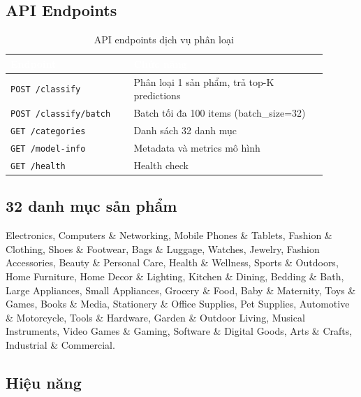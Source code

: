 \subsection{API Endpoints}

\begin{table}[htbp]
\centering
\caption{API endpoints dịch vụ phân loại}
\label{tab:classify-api}
\begin{tabular}{>{\raggedright\arraybackslash}p{0.35\linewidth} >{\raggedright\arraybackslash}p{0.55\linewidth}}
\toprule
\rowcolor{headerblue} \textcolor{white}{\textbf{Endpoint}} & \textcolor{white}{\textbf{Chức năng}} \\
\midrule
\rowcolor{rowgray} \texttt{POST /classify} & Phân loại 1 sản phẩm, trả top-K predictions \\
\texttt{POST /classify/batch} & Batch tối đa 100 items (batch\_size=32) \\
\rowcolor{rowgray} \texttt{GET /categories} & Danh sách 32 danh mục \\
\texttt{GET /model-info} & Metadata và metrics mô hình \\
\rowcolor{rowgray} \texttt{GET /health} & Health check \\
\bottomrule
\end{tabular}
\end{table}

\subsection{32 danh mục sản phẩm}

Electronics, Computers \& Networking, Mobile Phones \& Tablets, Fashion \& Clothing,
Shoes \& Footwear, Bags \& Luggage, Watches, Jewelry, Fashion Accessories,
Beauty \& Personal Care, Health \& Wellness, Sports \& Outdoors, Home Furniture,
Home Decor \& Lighting, Kitchen \& Dining, Bedding \& Bath, Large Appliances,
Small Appliances, Grocery \& Food, Baby \& Maternity, Toys \& Games, Books \& Media,
Stationery \& Office Supplies, Pet Supplies, Automotive \& Motorcycle,
Tools \& Hardware, Garden \& Outdoor Living, Musical Instruments,
Video Games \& Gaming, Software \& Digital Goods, Arts \& Crafts,
Industrial \& Commercial.

\subsection{Hiệu năng}

